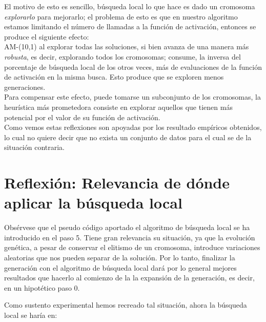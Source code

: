 El  motivo de esto es sencillo, búsqueda local lo que hace es dado un 
cromosoma \textit{explorarlo} para mejorarlo; el problema de esto es que en 
nuestro algoritmo estamos limitando el número de llamadas a la función de 
activación, entonces se produce el siguiente efecto: \\

AM-(10,1) al explorar todas las soluciones, si bien avanza de una manera 
más \textit{robusta}, es decir, explorando todos los cromosomas; consume, la 
inversa del porcentaje de búsqueda local de los otros veces, más de 
evaluaciones de la función de activación en la misma busca. Esto produce que se exploren menos generaciones. 
\\

Para compensar este efecto, puede tomarse un subconjunto de los cromosomas, la heurística más prometedora consiste en explorar aquellos que tienen más potencial por el valor de su función de activación. 
\\

Como vemos estas reflexiones son apoyadas por los resultado empíricos obtenidos, lo cual no quiere decir que no exista un conjunto de datos para el cual se de la situación contraria. 

\section{Reflexión: Relevancia de dónde aplicar la búsqueda local}  

Obsérvese que el pseudo código aportado el algoritmo de búsqueda local se ha 
introducido en el paso 5. Tiene gran relevancia su situación, ya que la evolución genética, a pesar de conservar el elitismo de un cromosoma, introduce variaciones aleatorias que nos pueden separar de la solución. 
Por lo tanto, finalizar la generación con el algoritmo de búsqueda local 
dará por lo general mejores resultados que hacerlo al comienzo de la la 
expansión de la generación, es decir, en un hipotético paso 0. 

Como sustento experimental hemos recreado tal situación, ahora la búsqueda local se haría en: 


